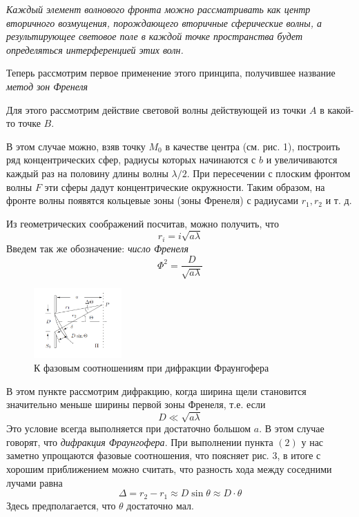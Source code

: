 \documentclass[a4paper]{article}
\begin{document}
\textit{Каждый элемент волнового фронта можно рассматривать как центр  вторичного возмущения, порождающего вторичные сферические волны, а результирующее световое поле  в каждой точке пространства будет определяться интерференцией этих волн.}

Теперь рассмотрим первое применение этого принципа, получившее название \textit{метод зон Френеля}

Для этого рассмотрим действие световой волны действующей из точки $A$ в какой-то точке $B$.

В этом случае можно, взяв точку $M_0$ в качестве центра (см. рис. 1), построить ряд концентрических сфер, радиусы которых начинаются с $b$ и увеличиваются каждый раз на половину длины волны $\lambda/2$. При пересечении с плоским фронтом волны $F$ эти сферы дадут концентрические окружности. Таким образом, на фронте волны появятся кольцевые зоны (зоны Френеля) с радиусами $r_1, r_2$ и т. д.

Из геометрических соображений посчитав, можно получить, что 
\begin{equation}
r_i = i \sqrt{a \lambda}
\end{equation}	
Введем так же обозначение: \textit{число Френеля}
\begin{equation}
\Phi^2 = \frac{D}{\sqrt{a\lambda}}
\end{equation}
\begin{figure}
  \begin{center}
    \includegraphics[width = 0.3\textwidth]{3.png}
  \end{center}
  \caption{К фазовым соотношениям при дифракции Фраунгофера}
\end{figure}
В этом пункте рассмотрим дифракцию, когда ширина щели становится значительно меньше ширины первой зоны Френеля, т.е. если 
\begin{equation}
D \ll\sqrt{a \lambda} 
\end{equation}	
Это условие всегда выполняется при достаточно большом $a$. В этом случае говорят, что \textit{дифракция Фраунгофера}. При выполнении пункта $(2)$ у нас заметно упрощаются фазовые соотношения, что поясняет рис. 3, в итоге с хорошим приближением можно считать, что разность хода между соседними лучами равна 
\begin{equation}
\Delta = r_2 - r_1 \approx D \sin \theta \approx D \cdot \theta
\end{equation}
Здесь предполагается, что $\theta$ достаточно мал.
\end{document}
